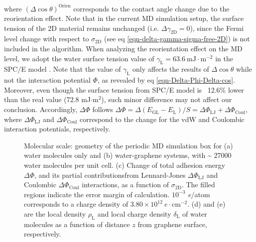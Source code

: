where \((\Delta\cos \theta)^{\mathrm{Orien}}\) corresponds to the
contact angle change due to the reorientation effect. Note that in the
current MD simulation setup, the surface tension of the 2D material
remains unchanged (i.e.  \(\Delta \gamma_{\mathrm{2D}}=0\)), since the
Fermi level change with respect to \(\sigma_{\mathrm{2D}}\) (see eq
\ref{eqn-delta-gamma-sigma-free-2D}) is not included in the algorithm.
When analyzing the reorientation effect on the MD level, we adopt the
water surface tension value of
\(\gamma_{\mathrm{L}}=63.6\ \mathrm{mJ}\cdot \mathrm{m}^{-2}\) in the
SPC/E model \cite{Vega_2007}. Note that the value of
\(\gamma_{\mathrm{L}}\) only affects the results of
\(\Delta \cos \theta\) while not the interaction potential \(\Phi\), as revealed by eq
\ref{eqn-Delta-Phi-Delta-cos}. Moreover, even though the surface
tension from SPC/E model is ~12.6\% lower than the real value (72.8
mJ\(\cdot\)m\(^2\)), such minor difference may not affect our
conclusion. Accordingly, \(\Delta \Phi\) follows
\(\Delta \Phi = \Delta (E_{\mathrm{GL}} - E_{\mathrm{L}})/S = \Delta
\Phi_{\mathrm{LJ}} + \Delta \Phi_{\mathrm{Coul}}\), where
\(\Delta \Phi_{\mathrm{LJ}}\) and \(\Delta \Phi_{\mathrm{Coul}}\)
correspond to the change for the vdW and Coulombic interaction
potentials, respectively.

\begin{figure}[htbp]
\centering
\caption{\label{fig:MD-res} Molecular scale: geometry of the periodic
  MD simulation box for (a) water molecules only and (b)
  water-graphene systems, with \textasciitilde{} 27000 water molecules
  per unit cell. (c) Change of total adhesion energy \(\Delta\Phi\),
  and its partial contributionsfrom Lennard-Jones
  \(\Delta\Phi_{\mathrm{LJ}}\) and Coulombic
  \(\Delta\Phi_{\mathrm{Coul}}\) interactions, as a function of
  \(\sigma_{\mathrm{2D}}\). The filled regions indicate the error
  margin of calculation. \(10^{-3}\) \textit{e}/atom corresponds to a
  charge density of \(3.80 \times 10^{12}\ e \cdot
  \mathrm{cm}^{-2}\). (d) and (e) are the local density
  \(\rho_{\mathrm{L}}\) and local charge density
  \(\delta_{\mathrm{L}}\) of water molecules as a function of distance
  \(z\) from graphene surface, respectively.}
\end{figure}

